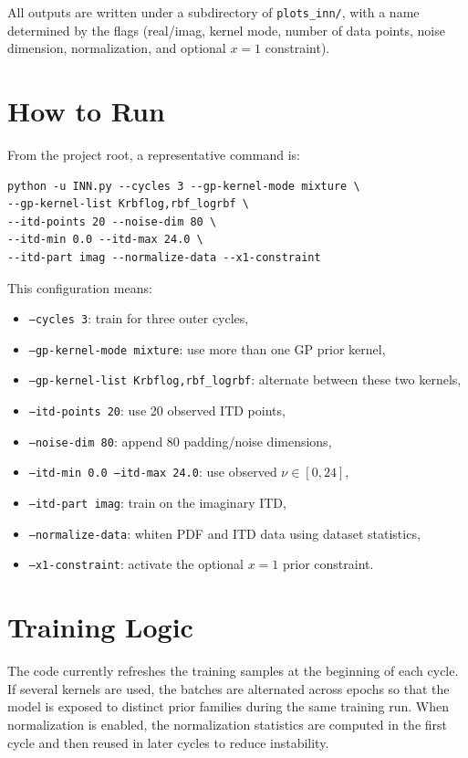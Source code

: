 \documentclass[11pt]{article}
\begin{document}
All outputs are written under a subdirectory of \texttt{plots\_inn/}, with a name determined by the flags (real/imag, kernel mode, number of data points, noise dimension, normalization, and optional $x=1$ constraint).

\section*{How to Run}
From the project root, a representative command is:

\begin{Verbatim}[fontsize=\small]
python -u INN.py --cycles 3 --gp-kernel-mode mixture \
--gp-kernel-list Krbflog,rbf_logrbf \
--itd-points 20 --noise-dim 80 \
--itd-min 0.0 --itd-max 24.0 \
--itd-part imag --normalize-data --x1-constraint
\end{Verbatim}

\noindent This configuration means:
\begin{itemize}[leftmargin=1.5em]
    \item \texttt{--cycles 3}: train for three outer cycles,
    \item \texttt{--gp-kernel-mode mixture}: use more than one GP prior kernel,
    \item \texttt{--gp-kernel-list Krbflog,rbf\_logrbf}: alternate between these two kernels,
    \item \texttt{--itd-points 20}: use 20 observed ITD points,
    \item \texttt{--noise-dim 80}: append 80 padding/noise dimensions,
    \item \texttt{--itd-min 0.0 --itd-max 24.0}: use observed $\nu \in [0,24]$,
    \item \texttt{--itd-part imag}: train on the imaginary ITD,
    \item \texttt{--normalize-data}: whiten PDF and ITD data using dataset statistics,
    \item \texttt{--x1-constraint}: activate the optional $x=1$ prior constraint.
\end{itemize}

\section*{Training Logic}
The code currently refreshes the training samples at the beginning of each cycle. If several kernels are used, the batches are alternated across epochs so that the model is exposed to distinct prior families during the same training run. When normalization is enabled, the normalization statistics are computed in the first cycle and then reused in later cycles to reduce instability.
\end{document}

